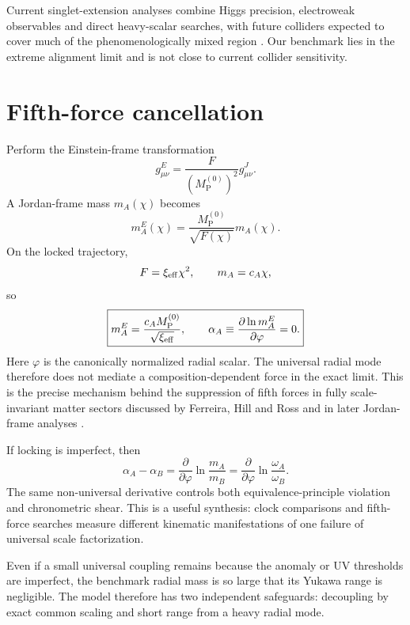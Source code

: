 \documentclass[11pt,a4paper]{article}
\newcommand{\MP}{M_{\mathrm P}}
\begin{document}
Current singlet-extension analyses combine Higgs precision, electroweak observables and direct heavy-scalar searches, with future colliders expected to cover much of the phenomenologically mixed region \cite{Bosse2026}. Our benchmark lies in the extreme alignment limit and is not close to current collider sensitivity.

\section{Fifth-force cancellation}

Perform the Einstein-frame transformation
\begin{equation}
 g^E_{\mu\nu}=\frac{F}{(\MP^{(0)})^2}g^J_{\mu\nu}.
\label{eq:einstein}
\end{equation}
A Jordan-frame mass $m_A(\chi)$ becomes
\begin{equation}
 m_A^E(\chi)=\frac{\MP^{(0)}}{\sqrt{F(\chi)}}m_A(\chi).
\label{eq:massE}
\end{equation}
On the locked trajectory,
\[
F=\xi_{\rm eff}\chi^2,
\qquad
m_A=c_A\chi,
\]
so
\begin{equation}
\boxed{
 m_A^E=\frac{c_A\MP^{(0)}}{\sqrt{\xi_{\rm eff}}},
\qquad
\alpha_A\equiv\frac{\partial\ln m_A^E}{\partial\varphi}=0.
}
\label{eq:fifthcancel}
\end{equation}
Here $\varphi$ is the canonically normalized radial scalar. The universal radial mode therefore does not mediate a composition-dependent force in the exact limit. This is the precise mechanism behind the suppression of fifth forces in fully scale-invariant matter sectors discussed by Ferreira, Hill and Ross and in later Jordan-frame analyses \cite{Ferreira2016,Copeland2022}.

If locking is imperfect, then
\begin{equation}
\alpha_A-\alpha_B
=\frac{\partial}{\partial\varphi}
\ln\frac{m_A}{m_B}
=\frac{\partial}{\partial\varphi}
\ln\frac{\omega_A}{\omega_B}.
\label{eq:alphashear}
\end{equation}
The same non-universal derivative controls both equivalence-principle violation and chronometric shear. This is a useful synthesis: clock comparisons and fifth-force searches measure different kinematic manifestations of one failure of universal scale factorization.

Even if a small universal coupling remains because the anomaly or UV thresholds are imperfect, the benchmark radial mass is so large that its Yukawa range is negligible. The model therefore has two independent safeguards: decoupling by exact common scaling and short range from a heavy radial mode.
\end{document}

